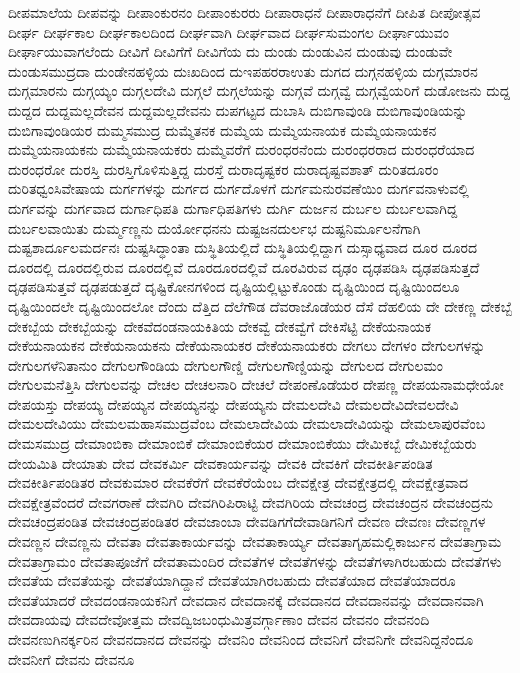 {ದೀಪಮಾಲೆಯ
ದೀಪವನ್ನು
ದೀಪಾಂಕುರನಂ
ದೀಪಾಂಕುರರು
ದೀಪಾರಾಧನೆ
ದೀಪಾರಾಧನೆಗೆ
ದೀಪಿತ
ದೀಪೋತ್ಸವ
ದೀರ್ಘ
ದೀರ್ಘಕಾಲ
ದೀರ್ಘಕಾಲದಿಂದ
ದೀರ್ಘವಾಗಿ
ದೀರ್ಘವಾದ
ದೀರ್ಘಸುಮಂಗಲ
ದೀರ್ಘಾಯುವಂ
ದೀರ್ಘಾಯುವಾಗಲೆಂದು
ದೀವಿಗೆ
ದೀವಿಗೆಗೆ
ದೀವಿಗೆಯ
ದು
ದುಂಡು
ದುಂಡುವಿನ
ದುಂಡುವು
ದುಂಡುವೇ
ದುಂಡುಸಮುದ್ರದಾ
ದುಂಡೇನಹಳ್ಳಿಯ
ದುಃಖದಿಂದ
ದುಇಪಹರರಾಉತು
ದುಗದ
ದುಗ್ಗನಹಳ್ಳಿಯ
ದುಗ್ಗಮಾರನ
ದುಗ್ಗಮಾರನು
ದುಗ್ಗಯ್ಯಂ
ದುಗ್ಗಲದೇವಿ
ದುಗ್ಗಲೆ
ದುಗ್ಗಲೆಯನ್ನು
ದುಗ್ಗವೆ
ದುಗ್ಗವ್ವೆ
ದುಗ್ಗವ್ವೆಯರಿಗೆ
ದುಡೋಜನು
ದುದ್ದ
ದುದ್ದದ
ದುದ್ದಮಲ್ಲದೇವನ
ದುದ್ದಮಲ್ಲದೇವನು
ದುಪಗಟ್ಟದ
ದುಬಾಸಿ
ದುಬಿಗಾವುಂಡಿ
ದುಬಿಗಾವುಂಡಿಯನ್ನು
ದುಬಿಗಾವುಂಡಿಯರ
ದುಮ್ಮಸಮುದ್ರ
ದುಮ್ಮೆತನಕ
ದುಮ್ಮೆಯ
ದುಮ್ಮೆಯನಾಯಕ
ದುಮ್ಮೆಯನಾಯಕನ
ದುಮ್ಮೆಯನಾಯಕನು
ದುಮ್ಮೆಯನಾಯಕರು
ದುಮ್ಮೆವರೆಗೆ
ದುರಂಧರನೆಂದು
ದುರಂಧರರಾದ
ದುರಂಧರೆಯಾದ
ದುರಂಧರೋ
ದುರಸ್ತಿ
ದುರಸ್ತಿಗೊಳಿಸುತ್ತಿದ್ದ
ದುರಸ್ತೆ
ದುರಾದೃಷ್ಟಕರ
ದುರಾದೃಷ್ಟವಶಾತ್
ದುರಿತದೂರಂ
ದುರಿತಧ್ವಂಸಿವೇಷಾಯ
ದುರ್ಗಗಳನ್ನು
ದುರ್ಗದ
ದುರ್ಗದೊಳಗೆ
ದುರ್ಗಮನುರವಣೆಯಿಂ
ದುರ್ಗವನಾಳುವಲ್ಲಿ
ದುರ್ಗವನ್ನು
ದುರ್ಗವಾದ
ದುರ್ಗಾಧಿಪತಿ
ದುರ್ಗಾಧಿಪತಿಗಳು
ದುರ್ಗಿ
ದುರ್ಜನ
ದುರ್ಬಲ
ದುರ್ಬಲವಾಗಿದ್ದ
ದುರ್ಬಲವಾಯಿತು
ದುರ್ಮ್ಮಣ್ಣನು
ದುರ್ಯೋಧನನು
ದುಷ್ಟಜನದುರ್ಲಭ
ದುಷ್ಟನಿರ್ಮೂಲನೆಗಾಗಿ
ದುಷ್ಟಶಾರ್ದೂಲಮರ್ದನಃ
ದುಷ್ಟಸಿದ್ಧಾಂತಾ
ದುಸ್ಥಿತಿಯಲ್ಲಿದೆ
ದುಸ್ಥಿತಿಯಲ್ಲಿದ್ದಾಗ
ದುಸ್ಸಾಧ್ಯವಾದ
ದೂರ
ದೂರದ
ದೂರದಲ್ಲಿ
ದೂರದಲ್ಲಿರುವ
ದೂರದಲ್ಲಿವೆ
ದೂರದೂರದಲ್ಲಿವೆ
ದೂರವಿರುವ
ದೃಢಂ
ದೃಢಪಡಿಸಿ
ದೃಢಪಡಿಸುತ್ತದೆ
ದೃಢಪಡಿಸುತ್ತವೆ
ದೃಢಪಡುತ್ತದೆ
ದೃಷ್ಟಿಕೋನಗಳಿಂದ
ದೃಷ್ಟಿಯಲ್ಲಿಟ್ಟುಕೊಂಡು
ದೃಷ್ಟಿಯಿಂದ
ದೃಷ್ಟಿಯಿಂದಲೂ
ದೃಷ್ಟಿಯಿಂದಲೇ
ದೃಷ್ಟಿಯಿಂದಲೋ
ದೆಂದು
ದೆತ್ತಿದ
ದೆಲೆಗೌಡ
ದೆವರಾಜೊಡೆಯರ
ದೆಸೆ
ದೆಹಲಿಯ
ದೇ
ದೇಕಣ್ಣ
ದೇಕಬ್ಬೆ
ದೇಕಬ್ಬೆಯ
ದೇಕಬ್ಬೆಯನ್ನು
ದೇಕವೆದಂಡನಾಯಕಿತಿಯ
ದೇಕವ್ವೆ
ದೇಕವ್ವೆಗೆ
ದೇಕಿಸೆಟ್ಟಿ
ದೇಕೆಯನಾಯಕ
ದೇಕೆಯನಾಯಕನ
ದೇಕೆಯನಾಯಕನು
ದೇಕೆಯನಾಯಕರ
ದೇಕೆಯನಾಯಕರು
ದೇಗಲು
ದೇಗಳಂ
ದೇಗುಲಗಳನ್ನು
ದೇಗುಲಗಳೆನಿತಾನುಂ
ದೇಗುಲಗೌಂಡಿಯ
ದೇಗುಲಗೌಣ್ಡಿ
ದೇಗುಲಗೌಣ್ಡಿಯನ್ನು
ದೇಗುಲದ
ದೇಗುಲಮಂ
ದೇಗುಲಮನೆತ್ತಿಸಿ
ದೇಗುಲವನ್ನು
ದೇಚಲ
ದೇಚಲನಾರಿ
ದೇಚಲೆ
ದೇಪಂಣೊಡೆಯರ
ದೇಪಣ್ಣ
ದೇಪಯನಾಮಧೇಯೋ
ದೇಪಯಸ್ತು
ದೇಪಯ್ಯ
ದೇಪಯ್ಯನ
ದೇಪಯ್ಯನನ್ನು
ದೇಪಯ್ಯನು
ದೇಮಲದೇವಿ
ದೇಮಲದೇವಿದೇವಲದೇವಿ
ದೇಮಲದೇವಿಯು
ದೇಮಲಮಹಾಸಮುದ್ರವೆಂಬ
ದೇಮಲಾದೇವಿಯ
ದೇಮಲಾದೇವಿಯನ್ನು
ದೇಮಲಾಪುರವೆಂಬ
ದೇಮಸಮುದ್ರ
ದೇಮಾಂಬಿಕಾ
ದೇಮಾಂಬಿಕೆ
ದೇಮಾಂಬಿಕೆಯರ
ದೇಮಾಂಬಿಕೆಯು
ದೇಮಿಕಬ್ಬೆ
ದೇಮಿಕಬ್ಬೆಯರು
ದೇಯಮಿತಿ
ದೇಯಾತು
ದೇವ
ದೇವಕರ್ಮಿ
ದೇವಕಾರ್ಯವನ್ನು
ದೇವಕಿ
ದೇವಕಿಗೆ
ದೇವಕೀರ್ತಿಪಂಡಿತ
ದೇವಕೀರ್ತಿಪಂಡಿತರ
ದೇವಕುಮಾರ
ದೇವಕೆರೆಗೆ
ದೇವಕೆರೆಯೆಂಬ
ದೇವಕ್ಷೇತ್ರ
ದೇವಕ್ಷೇತ್ರದಲ್ಲಿ
ದೇವಕ್ಷೇತ್ರವಾದ
ದೇವಕ್ಷೇತ್ರವೆಂದರೆ
ದೇವಗರಾಣೆ
ದೇವಗಿರಿ
ದೇವಗಿರಿಪಿರಾಟ್ಟಿ
ದೇವಗಿರಿಯ
ದೇವಚಂದ್ರ
ದೇವಚಂದ್ರನ
ದೇವಚಂದ್ರನು
ದೇವಚಂದ್ರಪಂಡಿತ
ದೇವಚಂದ್ರಪಂಡಿತರ
ದೇವಜಾಂಬಾ
ದೇವಡಿಗಗೆದೇವಾಡಿಗನಿಗೆ
ದೇವಣ
ದೇವಣಃ
ದೇವಣ್ಣಗಳ
ದೇವಣ್ಣನ
ದೇವಣ್ಣನು
ದೇವತಾ
ದೇವತಾಕಾರ್ಯವನ್ನು
ದೇವತಾಕಾರ್ಯ್ಯ
ದೇವತಾಗೃಹಮಲ್ಲಿಕಾರ್ಜುನ
ದೇವತಾಗ್ರಾಮ
ದೇವತಾಗ್ರಾಮಂ
ದೇವತಾಪೂಜೆಗೆ
ದೇವತಾಮಂದಿರ
ದೇವತೆಗಳ
ದೇವತೆಗಳನ್ನು
ದೇವತೆಗಳಾಗಿರಬಹುದು
ದೇವತೆಗಳು
ದೇವತೆಯ
ದೇವತೆಯನ್ನು
ದೇವತೆಯಾಗಿದ್ದಾನೆ
ದೇವತೆಯಾಗಿರಬಹುದು
ದೇವತೆಯಾದ
ದೇವತೆಯಾದರೂ
ದೇವತೆಯಾದರೆ
ದೇವದಂಡನಾಯಕನಿಗೆ
ದೇವದಾನ
ದೇವದಾನಕ್ಕೆ
ದೇವದಾನದ
ದೇವದಾನವನ್ನು
ದೇವದಾನವಾಗಿ
ದೇವದಾಯವು
ದೇವದೇವೋತ್ತಮ
ದೇವದ್ವಿಜಬಂಧುಮಿತ್ರವರ್ಗ್ಗಾಣಾಂ
ದೇವನ
ದೇವನಂ
ದೇವನಂದಿ
ದೇವನಣುಗಿನರ್ಕ್ಕರಿನ
ದೇವನದಾನದ
ದೇವನನ್ನು
ದೇವನಿಂ
ದೇವನಿಂದ
ದೇವನಿಗೆ
ದೇವನಿಗೇ
ದೇವನಿದ್ದನೆಂದೂ
ದೇವನೀಗೆ
ದೇವನು
ದೇವನೂ
}
